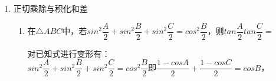\begin{enumerate}
\begin{enumerate}
        \item 已知$sinx + siny = \sqrt{2}$，$cosx + cosy = \dfrac{2\sqrt{3}}{3}$，求$sin(x+y)$以及$tanx+tany$
        \begin{jieda}
            从已知条件出发，如果使用和差化积公式可以得到目标$sin(x+y)$的半角的三角函数值，然后可以再进行变形以得到结果.\\
            根据和差化积公式有$2sin\dfrac{x+y}{2}cos\dfrac{x-y}{2} = \sqrt{2} \quad 2cos\dfrac{x+y}{2}cos\dfrac{x-y}{2} = \dfrac{2\sqrt{3}}{3}$ \\
            两式相除后可以得到目标角半角的正切值，可以考虑万能公式得到目标角正弦值.\\
            设$t = tan\dfrac{x+y}{2} = \dfrac{\sqrt{6}}{2}, \quad $ 则$sin(x+y) = \dfrac{2t}{t^2 + 1} = \dfrac{2\sqrt{6}}{5}$ \\
            考虑到$tanx + tany = \dfrac{sinx}{cosx} + \dfrac{siny}{cosy} = \dfrac{sinx \cdot cosy + cosx \cdot siny}{cosx \cdot cosy} = \dfrac{sin(x+y)}{cosx \cdot cosy}$，观察分母可以利用积化和差公式变形.\\
            $cosx \cdot cosy = \dfrac{1}{2}[cos(x+y)+cos(x-y)]$.前者可以再次利用万能公式得到，而后者利用和角公式展开后，发现可以由题目中的条件平方相加或相减得到.\\
            $cos(x+y) = \dfrac{1-t^2}{1+t^2} = -\dfrac{1}{5}$ \\
            $cos(x-y) = cosx cosy + sinx siny = \dfrac{2cosx cosy + 2sinx siny}{2} \\
            = \dfrac{(cosx+cosy)^2+(sinx+siny)^2-2}{2} = \dfrac{2}{3}$ \\
            $cosx \cdot cosy = \dfrac{1}{2}(\dfrac{2}{3} - \dfrac{1}{5}) = \dfrac{7}{30}$，$tanx + tany = \dfrac{2\sqrt{6}}{5} \div \dfrac{7}{30} = \dfrac{12\sqrt{6}}{7}$
        \end{jieda}
    \end{enumerate}
    \item 正切乘除与积化和差
    \begin{enumerate}
        \item 在$\triangle ABC$中，若$sin^2\dfrac{A}{2} + sin^2\dfrac{B}{2}+sin^2\dfrac{C}{2} = cos^2\dfrac{B}{2}$，则$tan\dfrac{A}{2}tan\dfrac{C}{2} = $
        \begin{jieda}
            对已知式进行变形有：\\
            $sin^2\dfrac{A}{2} + sin^2\dfrac{B}{2}+sin^2\dfrac{C}{2} = cos^2\dfrac{B}{2}$即$\dfrac{1-cosA}{2} + \dfrac{1-cosC}{2} = cosB$，\\

\end{jieda}
\end{enumerate}
\end{enumerate}
